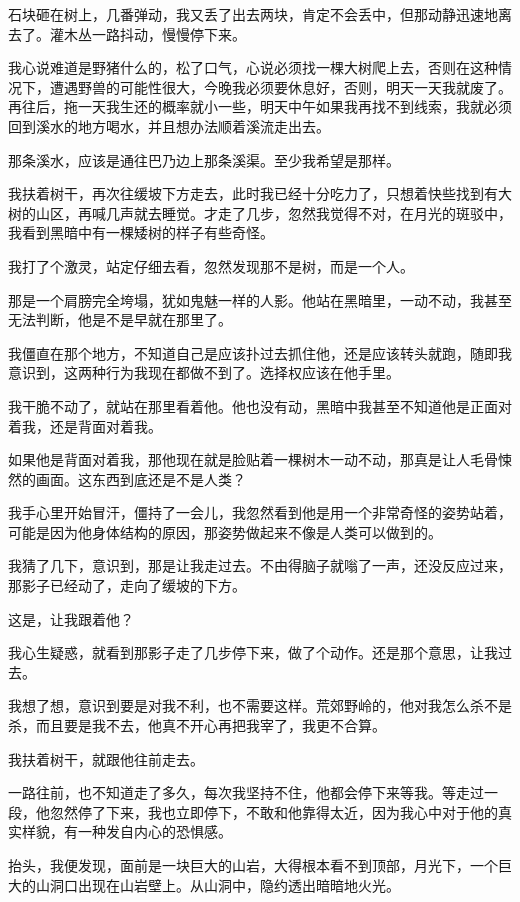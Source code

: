 石块砸在树上，几番弹动，我又丢了出去两块，肯定不会丢中，但那动静迅速地离去了。灌木丛一路抖动，慢慢停下来。

我心说难道是野猪什么的，松了口气，心说必须找一棵大树爬上去，否则在这种情况下，遭遇野兽的可能性很大，今晚我必须要休息好，否则，明天一天我就废了。再往后，拖一天我生还的概率就小一些，明天中午如果我再找不到线索，我就必须回到溪水的地方喝水，并且想办法顺着溪流走出去。

那条溪水，应该是通往巴乃边上那条溪渠。至少我希望是那样。

我扶着树干，再次往缓坡下方走去，此时我已经十分吃力了，只想着快些找到有大树的山区，再喊几声就去睡觉。才走了几步，忽然我觉得不对，在月光的斑驳中，我看到黑暗中有一棵矮树的样子有些奇怪。

我打了个激灵，站定仔细去看，忽然发现那不是树，而是一个人。

那是一个肩膀完全垮塌，犹如鬼魅一样的人影。他站在黑暗里，一动不动，我甚至无法判断，他是不是早就在那里了。

我僵直在那个地方，不知道自己是应该扑过去抓住他，还是应该转头就跑，随即我意识到，这两种行为我现在都做不到了。选择权应该在他手里。

我干脆不动了，就站在那里看着他。他也没有动，黑暗中我甚至不知道他是正面对着我，还是背面对着我。

如果他是背面对着我，那他现在就是脸贴着一棵树木一动不动，那真是让人毛骨悚然的画面。这东西到底还是不是人类？

我手心里开始冒汗，僵持了一会儿，我忽然看到他是用一个非常奇怪的姿势站着，可能是因为他身体结构的原因，那姿势做起来不像是人类可以做到的。

我猜了几下，意识到，那是让我走过去。不由得脑子就嗡了一声，还没反应过来，那影子已经动了，走向了缓坡的下方。

这是，让我跟着他？

我心生疑惑，就看到那影子走了几步停下来，做了个动作。还是那个意思，让我过去。

我想了想，意识到要是对我不利，也不需要这样。荒郊野岭的，他对我怎么杀不是杀，而且要是我不去，他真不开心再把我宰了，我更不合算。

我扶着树干，就跟他往前走去。

一路往前，也不知道走了多久，每次我坚持不住，他都会停下来等我。等走过一段，他忽然停了下来，我也立即停下，不敢和他靠得太近，因为我心中对于他的真实样貌，有一种发自内心的恐惧感。

抬头，我便发现，面前是一块巨大的山岩，大得根本看不到顶部，月光下，一个巨大的山洞口出现在山岩壁上。从山洞中，隐约透出暗暗地火光。

